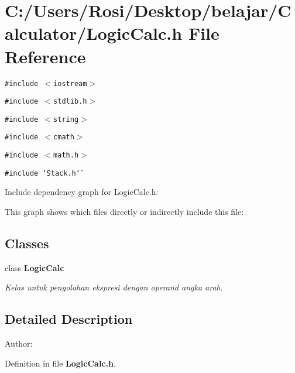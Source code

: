 \section{C:/Users/Rosi/Desktop/belajar/Calculator/Logic\-Calc.h File Reference}
\label{_logic_calc_8h}
{\tt \#include $<$iostream$>$}\par
{\tt \#include $<$stdlib.h$>$}\par
{\tt \#include $<$string$>$}\par
{\tt \#include $<$cmath$>$}\par
{\tt \#include $<$math.h$>$}\par
{\tt \#include \char`\"{}Stack.h\char`\"{}}\par


Include dependency graph for Logic\-Calc.h:

This graph shows which files directly or indirectly include this file:\subsection*{Classes}
\begin{CompactItemize}
\item 
class {\bf Logic\-Calc}
\begin{CompactList}\small\item\em Kelas untuk pengolahan ekspresi dengan operand angka arab. \item\end{CompactList}\end{CompactItemize}


\subsection{Detailed Description}
\begin{Desc}
\item[Author:]\end{Desc}


Definition in file {\bf Logic\-Calc.h}.